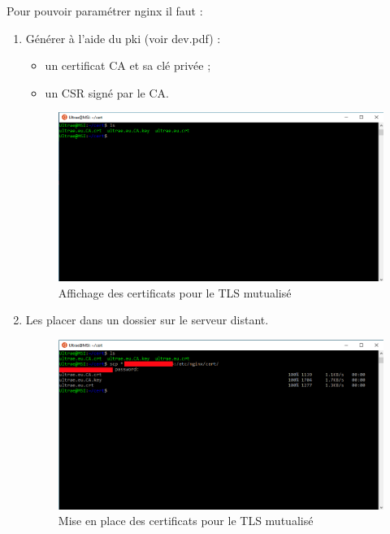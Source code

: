 Pour pouvoir paramétrer nginx il faut :
\begin{enumerate}
    \item Générer à l'aide du pki (voir dev.pdf) :
    \begin{itemize}
        \item un certificat CA et sa clé privée ;
        \item un CSR signé par le CA.
    \end{itemize}
    \begin{figure}[h!]
	    \begin{center}
		    \includegraphics[scale=0.5]{Interception_Screenshots/mut01.png}
		    \caption{Affichage des certificats pour le TLS mutualisé}
	    \end{center}
    \end{figure}
    \FloatBarrier
    
    \item Les placer dans un dossier sur le serveur distant. 
    \begin{figure}[h!]
	    \begin{center}
		    \includegraphics[scale=0.5]{Interception_Screenshots/mut02.png}
		    \caption{Mise en place des certificats pour le TLS mutualisé}
	    \end{center}
    \end{figure}
    \FloatBarrier
    

\end{enumerate}
